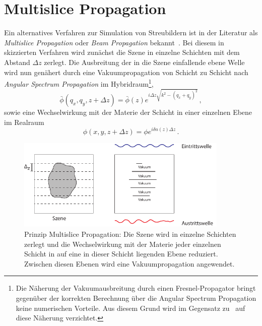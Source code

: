 \section{Multislice Propagation}
Ein alternatives Verfahren zur Simulation von Streubildern ist in der Literatur als \textit{Multislice Propagation} oder \textit{Beam Propagation} bekannt~\cite{hare1994,cowley1957}. Bei diesem in  skizzierten Verfahren wird zunächst die Szene in einzelne Schichten mit dem Abstand $\Delta z$ zerlegt. Die Ausbreitung der in die Szene einfallende ebene Welle wird nun genähert durch eine Vakuumpropagation von Schicht zu Schicht nach \textit{Angular Spectrum Propagation} im Hybridraum\footnote{Die Näherung der Vakuumausbreitung durch einen Fresnel-Propagator bringt gegenüber der korrekten Berechnung über die Angular Spectrum Propagation keine numerischen Vorteile. Aus diesem Grund wird im Gegensatz zu~\cite{hare1994} auf diese Näherung verzichtet.},
\begin{equation}
	\bar{\phi}\left(q_x,q_y,z+\Delta z\right)=\bar{\phi}(z)e^{i\Delta z\sqrt{k^2-(q_x+q_y)^2}} \, ,
\end{equation}
sowie eine Wechselwirkung mit der Materie der Schicht in einer einzelnen Ebene im Realraum
\begin{equation}
	\phi(x,y,z+\Delta z)=\phi e^{i\delta n\left(z\right) \Delta z} \, .
\end{equation}
\begin{figure}
	\centering
	\includegraphics[width=0.9\textwidth]{images/multislice.pdf}
	\caption[Prinzip Multislice Propagation]{Prinzip Multislice Propagation: Die Szene wird in einzelne Schichten zerlegt und die Wechselwirkung mit der Materie jeder einzelnen Schicht in auf eine in dieser Schicht liegenden Ebene reduziert. Zwischen diesen Ebenen wird eine Vakuumpropagation angewendet.}
	\label{fig:multislice}
\end{figure} 	

